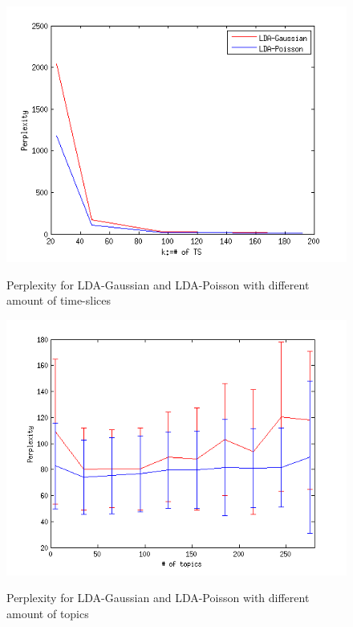 \begin{figure}[h!]
 \centering
 \begin{minipage}[b]{0.45\linewidth}
  \centering
  \includegraphics[width=\textwidth]{Pictures/CompareTSgausPois.png}
  \caption{Perplexity for LDA-Gaussian and LDA-Poisson with different amount of time-slices}
  \label{fig:CompareTS}
 \end{minipage}
 \begin{minipage}[b]{0.45\linewidth}
  \centering
  \includegraphics[width=\textwidth]{Pictures/CompareCrossTops.png}
\caption{Perplexity for LDA-Gaussian and LDA-Poisson with different amount of topics}
  \label{fig:CompareK}
 \end{minipage}
 \caption{}
 \label{fig:Compare}
\end{figure}


